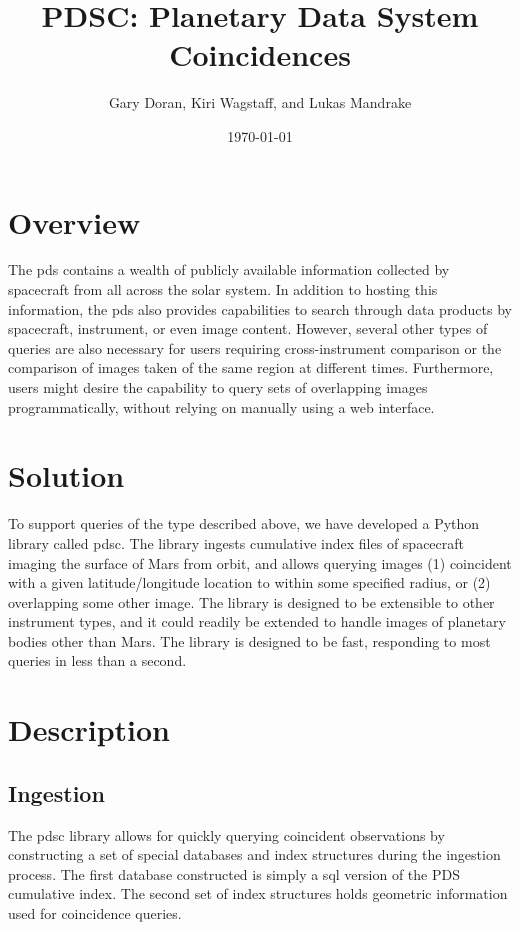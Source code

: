 \documentclass[twocolumn]{extarticle}
\title{
  PDSC: Planetary Data System Coincidences
}
\author{Gary Doran, Kiri Wagstaff, and Lukas Mandrake}
\date{\today}
\begin{document}
\maketitle

\section*{Overview}
The \ac{pds} contains a wealth of publicly available information collected by
spacecraft from all across the solar system. In addition to hosting this
information, the \ac{pds} also provides capabilities to search through data
products by spacecraft, instrument, or even image content. However, several
other types of queries are also necessary for users requiring cross-instrument
comparison or the comparison of images taken of the same region at different
times. Furthermore, users might desire the capability to query sets of
overlapping images programmatically, without relying on manually using a web
interface.

\section*{Solution}
To support queries of the type described above, we have developed a Python
library called \ac{pdsc}. The library ingests cumulative index files of
spacecraft imaging the surface of Mars from orbit, and allows querying images
(1) coincident with a given latitude/longitude location to within some
specified radius, or (2) overlapping some other image. The library is designed
to be extensible to other instrument types, and it could readily be extended to
handle images of planetary bodies other than Mars. The library is designed to
be fast, responding to most queries in less than a second.

\section*{Description}

\subsection*{Ingestion}
The \ac{pdsc} library allows for quickly querying coincident observations by
constructing a set of special databases and index structures during the
ingestion process. The first database constructed is simply a \ac{sql} version
of the PDS cumulative index. The second set of index structures holds geometric
information used for coincidence queries.
\end{document}
